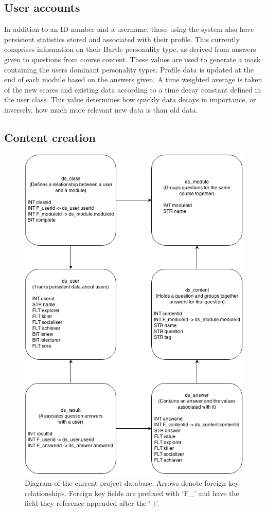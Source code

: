 \documentclass[10pt,a4paper]{report}
\begin{document}
\subsection*{User accounts}
In addition to an ID number and a username, those using the system also have persistent statistics stored and associated with their profile. This currently comprises information on their Bartle personality type, as derived from answers given to questions from course content. These values are used to generate a mask containing the users dominant personality types. Profile data is updated at the end of each module based on the answers given. A time weighted average is taken of the new scores and existing data according to a time decay constant defined in the user class. This value determines how quickly data decays in importance, or inversely, how much more relevant new data is than old data.

\subsection*{Content creation}

\begin{figure}
	\includegraphics[width=\textwidth]{../img/database.png}
	\caption{Diagram of the current project database. Arrows denote foreign key relationships. Foreign key fields are prefixed with `F\_' and have the field they reference appended after the `-$\rangle$'.}
	\label{db}
\end{figure}
\end{document}
